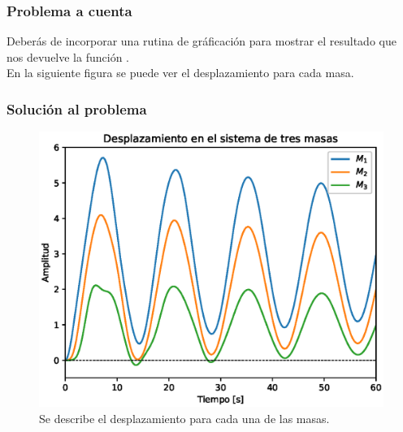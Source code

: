 \begin{frame}
\frametitle{Problema a cuenta}
Deberás de incorporar una rutina de gráficación para mostrar el resultado que nos devuelve la función .
\\
\bigskip
En la siguiente figura se puede ver el desplazamiento para cada masa.
\end{frame}
\begin{frame}[plain]
\frametitle{Solución al problema}
\begin{figure}
    \centering
    \includegraphics[scale=0.5]{Imagenes/ejercicio_odeint_04_sistema_3masas.eps}
    \caption{Se describe el desplazamiento para cada una de las masas.}
\end{figure}
\end{frame}
